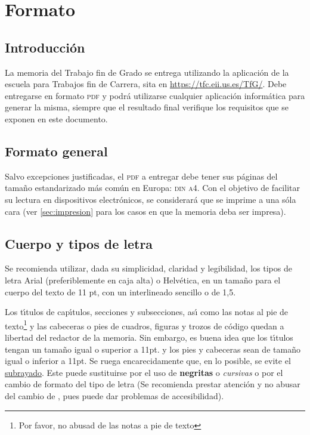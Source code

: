
\chapter{Formato}\label{cap1}
\section{Introducci\'on}\label{sec:intro}

La memoria del Trabajo fin de Grado se entrega utilizando la aplicaci\'on de la escuela para 
Trabajos fin de Carrera, sita en 
\url{https://tfc.eii.us.es/TfG/}. Debe entregarse en formato \textsc{pdf} y podr\'a utilizarse
cualquier aplicaci\'on inform\'atica para generar la misma, siempre que el resultado
final verifique los requisitos
que se exponen en este documento.


\section{Formato general}\label{sec:general}

Salvo excepciones justificadas, el \textsc{pdf} 
a entregar debe tener sus p\'aginas del tama{\~n}o
estandarizado m\'as com\'un en Europa: \textsc{din a4}. Con el objetivo de facilitar 
su lectura en dispositivos electr\'onicos, se considerará que
se imprime a una s\'ola cara (ver \ref{sec:impresion} para los casos en que la memoria deba ser impresa).


\section{Cuerpo y tipos de letra}\label{sec:letra}

Se recomienda utilizar, dada su simplicidad, claridad y legibilidad, los tipos de letra
Arial (preferiblemente en caja alta) o Helv\'etica, en un tamaño para el cuerpo del texto de 11 pt,
con un interlineado sencillo o de 1,5.

Los t{\'\i}tulos de cap{\'\i}tulos, secciones y subsecciones, as{\'\i} como las notas al pie de texto\footnote{Por favor, no abusad de las notas a pie de texto}
y las cabeceras o pies de cuadros, figuras y trozos de c\'odigo quedan a libertad del redactor de la memoria.
Sin embargo, es buena idea que los t{\'\i}tulos tengan un tamaño igual o superior a 11pt. y los pies y cabeceras
sean de tama{\~n}o igual o inferior a 11pt. Se ruega encarecidamente que, en lo posible, se evite el \underline{subrayado}.
Este puede sustituirse por el uso de \textbf{negritas} o \textit{cursivas} o por el cambio de formato del tipo de letra
(Se recomienda prestar atenci\'on y no abusar del cambio de {\color{blue}{color}}, 
pues puede dar problemas de accesibilidad).

